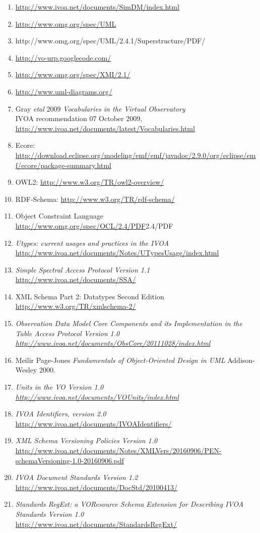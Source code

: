 \documentclass[10pt,a4paper]{ivoa}
\begin{document}
\begin{enumerate}
\item
  \url{http://www.ivoa.net/documents/SimDM/index.html}
\item
  \url{http://www.omg.org/spec/UML}
\item
  http://www.omg.org/spec/UML/2.4.1/Superstructure/PDF/
\item
  \url{http://vo-urp.googlecode.com/}
\item
  \url{http://www.omg.org/spec/XMI/2.1/}
\item
  \url{http://www.uml-diagrams.org/}
\item
  Gray \emph{etal} 2009 \emph{Vocabularies in the Virtual Observatory}\\
  IVOA recommendation 07 October 2009,
  \url{http://www.ivoa.net/documents/latest/Vocabularies.html}
\item
  Ecore:
  \href{http://download.eclipse.org/modeling/emf/emf/javadoc/2.9.0/org/eclipse/emf/ecore/package-summary.html\#details}{http://download.eclipse.org/modeling/emf/emf/javadoc/2.9.0/org/eclipse/emf/ecore/package-summary.html}
\item
  OWL2: \url{http://www.w3.org/TR/owl2-overview/}
\item
  RDF-Schema: \url{http://www.w3.org/TR/rdf-schema/}
\item
  Object Constraint Language
  \url{http://www.omg.org/spec/OCL/2.4/PDF}2.4/PDF
\item
  \emph{Utypes: current usages and practices in the IVOA}
  \url{http://www.ivoa.net/documents/Notes/UTypesUsage/index.html}
\item
  \emph{Simple Spectral Access Protocol Version 1.1}
  \url{http://www.ivoa.net/documents/SSA/}
\item
  XML Schema Part 2: Datatypes Second Edition
  \url{http://www.w3.org/TR/xmlschema-2/}
\item
  \emph{Observation Data Model Core Components and its Implementation in
  the Table Access Protocol Version 1.0
  \url{http://www.ivoa.net/documents/ObsCore/20111028/index.html}}
\item
  Meilir Page-Jones \emph{Fundamentals of Object-Oriented Design in UML}
  Addison-Wesley 2000.
\item
  \emph{Units in the VO Version 1.0}
  \href{http://www.ivoa.net/documents/VOUnits/index.html}{\emph{http://www.ivoa.net/documents/VOUnits/index.html}}
\item
  \emph{IVOA Identifiers, version 2.0\\
  }\url{http://www.ivoa.net/documents/IVOAIdentifiers/}
\item
  \emph{XML Schema Versioning Policies Version 1.0\\
  }\url{http://www.ivoa.net/documents/Notes/XMLVers/20160906/PEN-schemaVersioning-1.0-20160906.pdf}
\item
  \emph{IVOA Document Standards Version 1.2}
  \url{http://www.ivoa.net/documents/DocStd/20100413/}
\item
  \emph{Standards RegExt: a VOResource Schema Extension for Describing
  IVOA Standards Version 1.0\\
  }\url{http://www.ivoa.net/documents/StandardsRegExt/}
\end{enumerate}
\end{document}
